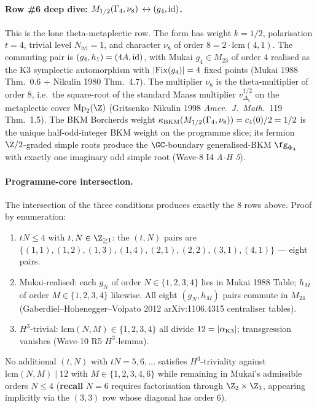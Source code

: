 \paragraph{Row \#6 deep dive: $M_{1/2}(\Gamma_4, \nu_{8})$
$\leftrightarrow (g_4, \mathrm{id})$.}\ClaimStatusTheorem{}
This is the lone theta-metaplectic row.  The form has weight $k = 1/2$,
polarisation $t = 4$, trivial level $N_{\mathrm{lvl}} = 1$, and
character $\nu_8$ of order $8 = 2 \cdot \mathrm{lcm}(4, 1)$.  The
commuting pair is $(g_4, h_1) = (4A, \mathrm{id})$, with Mukai $g_4 \in
M_{23}$ of order $4$ realised as the K3 symplectic automorphism
with $|\mathrm{Fix}(g_4)| = 4$ fixed points (Mukai 1988 Thm.~0.6 + Nikulin
1980 Thm.~4.7).  The multiplier $\nu_8$ is the theta-multiplier of
order $8$, i.e.\ the square-root of the standard Maass multiplier
$v_{\Delta_5}^{1/2}$ on the metaplectic cover $\mathrm{Mp}_2(\Z)$
(Gritsenko--Nikulin 1998 \emph{Amer.\ J.\ Math.}~119 Thm.~1.5).
The BKM Borcherds weight
$\kappa_{\mathrm{BKM}}(M_{1/2}(\Gamma_4, \nu_8)) = c_4(0)/2 = 1/2$ is the unique
half-odd-integer BKM weight on the programme slice; its fermion
$\Z/2$-graded simple roots produce the $\GC$-boundary
generalised-BKM $\fg_{\Phi_4}$ with exactly one imaginary odd
simple root (Wave-8 I4 \emph{A-H 5}).

\paragraph{Programme-core intersection.}\ClaimStatusTheorem{}
The intersection of the three conditions produces exactly the
$8$ rows above.  Proof by enumeration:
\begin{enumerate}
\itemsep 0pt
\item $tN \le 4$ with $t, N \in \Z_{\ge 1}$: the $(t, N)$
  pairs are $\{(1,1), (1,2), (1,3), (1,4), (2,1), (2,2), (3,1),
  (4,1)\}$ --- eight pairs.
\item Mukai-realised: each $g_N$ of order $N \in \{1,2,3,4\}$
  lies in Mukai 1988 Table; $h_M$ of order $M \in \{1,2,3,4\}$
  likewise.  All eight $(g_N, h_M)$ pairs commute in $M_{24}$
  (Gaberdiel--Hohenegger--Volpato 2012 arXiv:1106.4315
  centraliser tables).
\item $H^3$-trivial: $\mathrm{lcm}(N, M) \in \{1,2,3,4\}$
  all divide $12 = |\alpha_{\mathrm{K3}}|$; transgression vanishes
  (Wave-10 R5 $H^3$-lemma).
\end{enumerate}
No additional $(t, N)$ with $tN = 5, 6, \ldots$ satisfies
$H^3$-triviality against $\mathrm{lcm}(N, M) \mid 12$ with
$M \in \{1,2,3,4,6\}$ while remaining in Mukai's admissible
orders $N \le 4$ ({\bf recall} $N = 6$ requires factorisation
through $\Z_2 \times \Z_3$, appearing implicitly via the $(3,3)$
row whose diagonal has order $6$).

